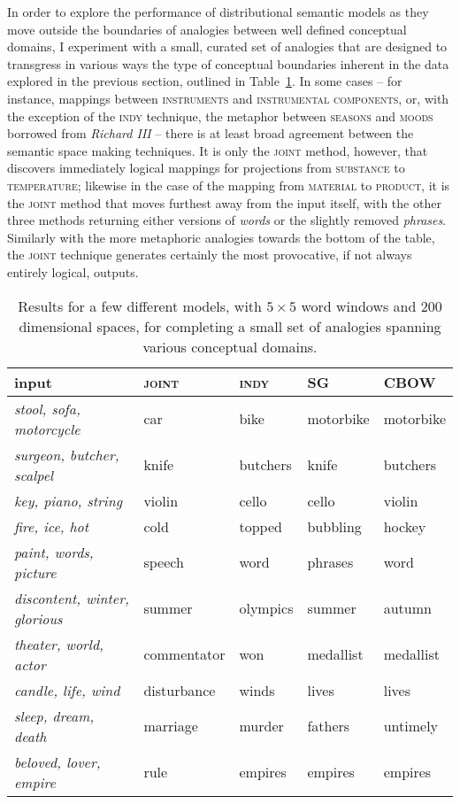 In order to explore the performance of distributional semantic models as they move outside the boundaries of analogies between well defined conceptual domains, I experiment with a small, curated set of analogies that are designed to transgress in various ways the type of conceptual boundaries inherent in the data explored in the previous section, outlined in Table~\ref{tab:transgressions}.  In some cases -- for instance, mappings between \textsc{instruments} and \textsc{instrumental components}, or, with the exception of the \textsc{indy} technique, the metaphor between \textsc{seasons} and \textsc{moods} borrowed from \emph{Richard III} -- there is at least broad agreement between the semantic space making techniques.  It is only the \textsc{joint} method, however, that discovers immediately logical mappings for projections from \textsc{substance} to \textsc{temperature}; likewise in the case of the mapping from \textsc{material} to \textsc{product}, it is the \textsc{joint} method that moves furthest away from the input itself, with the other three methods returning either versions of \emph{words} or the slightly removed \emph{phrases}.  Similarly with the more metaphoric analogies towards the bottom of the table, the \textsc{joint} technique generates certainly the most provocative, if not always entirely logical, outputs.

\begin{table}
\centering
\begin{tabular}{l|llll}
\hline
input & \textsc{joint} & \textsc{indy} & \textsc{SG} & \textsc{CBOW} \\
\hline
\emph{stool, sofa, motorcycle} & car & bike & motorbike & motorbike \\
\emph{surgeon, butcher, scalpel} & knife & butchers & knife & butchers \\
\emph{key, piano, string} & violin & cello & cello & violin \\
\emph{fire, ice, hot} & cold & topped & bubbling & hockey \\
\emph{paint, words, picture} & speech & word & phrases & word \\
\emph{discontent, winter, glorious} & summer & olympics & summer & autumn \\
\emph{theater, world, actor} & commentator & won & medallist & medallist \\
\emph{candle, life, wind} & disturbance & winds & lives & lives \\
\emph{sleep, dream, death} & marriage & murder & fathers & untimely \\
\emph{beloved, lover, empire} & rule & empires & empires & empires \\
\hline
\end{tabular}
\caption[Transgressive Analogies]{Results for a few different models, with $5 \times 5$ word windows and 200 dimensional spaces, for completing a small set of analogies spanning various conceptual domains.}
\label{tab:transgressions}
\end{table}

